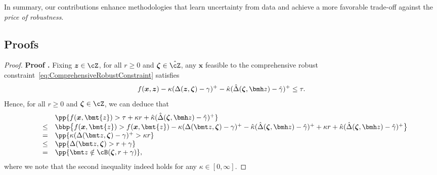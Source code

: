 \documentclass[mnsc, nonblindrev]{informswp}
\newcommand{\1}[1]{\mathds{1}{\left(#1\right)}}
\begin{document}
In summary, our contributions enhance methodologies that learn uncertainty from data and achieve a more favorable trade-off against the \emph{price of robustness}.





\newpage
\begin{appendices}

\section{Proofs}

\begin{proof}{\bf Proof .}
Fixing $\bm z \in \cZ$, for all $r \geq 0$ and $\bm \zeta  \in \hat \cZ$, any $\bm x$ feasible to the comprehensive robust constraint~\eqref{eq:ComprehensiveRobustConstraint} satisfies
\[
f(\bm x,\bm z) - \kappa (\Delta(\bm z,\bm \zeta) - \gamma)^+ - \hat \kappa (\hat \Delta(\bm \zeta,\bmh z) - \hat \gamma)^+ \leq \tau.
\]
Hence, for all $r \geq 0$ and $\bm \zeta  \in \cZ$, we can deduce that
$$
\begin{array}{rcl}
&& \pp{f(\bm{x},\bmt{z}) > \tau + \kappa r + \hat \kappa (\hat \Delta(\bm \zeta,\bmh z) - \hat \gamma)^+}\\
&\leq&  \bbp\big\{f(\bm{x},\bmt{z}) >  f(\bm{x}, \bmt{z}) - \kappa( \Delta(\bmt z,\bm \zeta) - \gamma)^+ - \hat\kappa(\hat \Delta(\bm \zeta,\bmh z) - \hat \gamma)^+  + \kappa r + \hat \kappa (\hat \Delta(\bm \zeta,\bmh z) - \hat \gamma)^+\big\}\\
& =& \pp{\kappa( \Delta(\bmt z,\bm \zeta) - \gamma)^+ > \kappa r} \\
&\leq & \pp{\Delta(\bmt z,\bm \zeta) > r+\gamma}\\
&=& \pp{\bmt z \notin \cB(\bm \zeta,r+\gamma)}, 
\end{array}
$$
where we note that the second inequality indeed holds for any $\kappa \in [0,\infty]$.
\hfill \Halmos
\end{proof}
\vspace{3mm}


\end{appendices}
\end{document}
